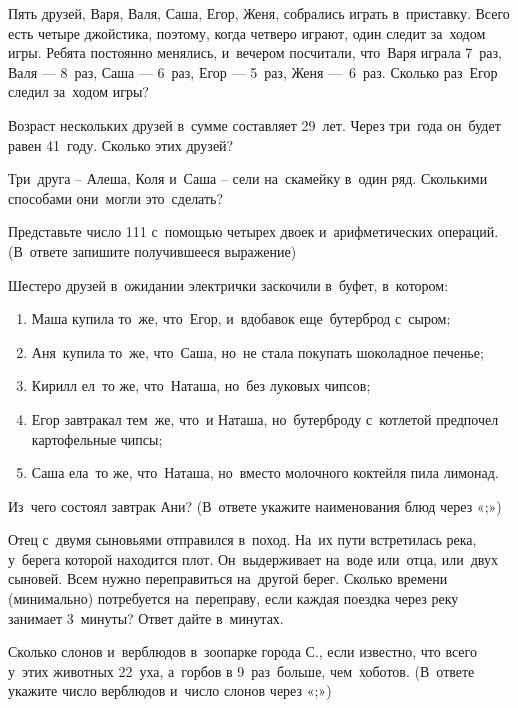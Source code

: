 Пять друзей, Варя, Валя, Саша, Егор, Женя, собрались играть в~приставку. 
Всего есть четыре джойстика, поэтому, когда четверо играют, один следит за~ходом игры. 
Ребята постоянно менялись, и~вечером посчитали, что~Варя играла 7~раз, Валя — 8~раз, Саша — 6~раз, Егор — 5~раз, Женя — 6~раз. 
Сколько раз~Егор следил за~ходом игры? 

Возраст нескольких друзей в~сумме составляет 29~лет. Через три~года он~будет равен 41~году. Сколько этих друзей?

Три~друга – Алеша, Коля и~Саша – сели на~скамейку в~один ряд. Сколькими способами они~могли это~сделать?

Представьте число 111 с~помощью четырех двоек и~арифметических операций. (В~ответе запишите получившееся выражение)

Шестеро друзей в~ожидании электрички заскочили в~буфет, в~котором:
\renewcommand{\labelenumi}{\arabic{enumi})}
\begin{enumerate}
    \item Маша купила то~же, что~Егор, и~вдобавок еще~бутерброд с~сыром;
    \item Аня~купила то~же, что~Саша, но~не стала покупать шоколадное печенье;
    \item Кирилл ел~то же, что~Наташа, но~без луковых чипсов;
    \item Егор завтракал тем~же, что~и Наташа, но~бутерброду с~котлетой предпочел картофельные чипсы;
    \item Саша ела~то же, что~Наташа, но~вместо молочного коктейля пила лимонад.
\end{enumerate}
Из~чего состоял завтрак Ани? (В~ответе укажите наименования блюд через «;»)

Отец с~двумя сыновьями отправился в~поход. На~их пути встретилась река, у~берега которой находится плот. 
Он~выдерживает на~воде или~отца, или~двух сыновей. Всем нужно переправиться на~другой берег. 
Сколько времени (минимально) потребуется на~переправу, если каждая поездка через реку занимает 3~минуты? 
Ответ дайте в~минутах.

Сколько слонов и~верблюдов в~зоопарке города С., если известно, что всего у~этих животных 22~уха, 
а~горбов в 9~раз~больше, чем~хоботов. (В~ответе укажите число верблюдов и~число слонов через «;»)

